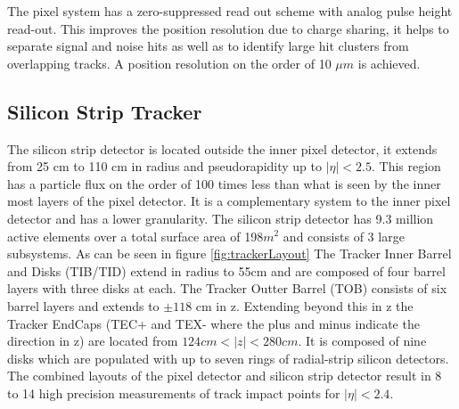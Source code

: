 The pixel system has a zero-suppressed read out scheme with analog pulse
height read-out. This improves the position resolution due to charge sharing,
it helps to separate signal and noise hits as well as to identify large hit 
clusters from overlapping tracks.
A position resolution on the order of 10 $\mu m$ is achieved.

\subsection{Silicon Strip Tracker}
The silicon strip detector is located outside the inner pixel detector, 
it extends from 25 cm to 110 cm in radius and pseudorapidity up to $|\eta|<2.5$. 
This region has a particle flux on 
the order of 100 times less than what is seen by the inner most layers of 
the pixel detector. It is a complementary system to the inner pixel
detector and has a lower granularity. The silicon strip detector 
has 9.3 million active elements over a total surface area of 198$m^{2}$
and consists of 3 large subsystems. As can be seen in figure \ref{fig:trackerLayout}
The Tracker Inner Barrel and Disks (TIB/TID) extend in radius to
55cm and are composed of four barrel layers with three disks at each.
The Tracker Outter Barrel (TOB) consists of six barrel layers and extends to $\pm118$ cm
in z. Extending beyond this in z the Tracker EndCaps (TEC+ and TEX- where the plus and minus
indicate the direction in z) are located from $124cm<|z|<280cm$. It is composed of 
nine disks which are populated with up to seven rings of radial-strip silicon detectors.
The combined layouts of the pixel detector and silicon strip detector
result in 8 to 14 high precision measurements of track impact points for 
$|\eta|<2.4$.
